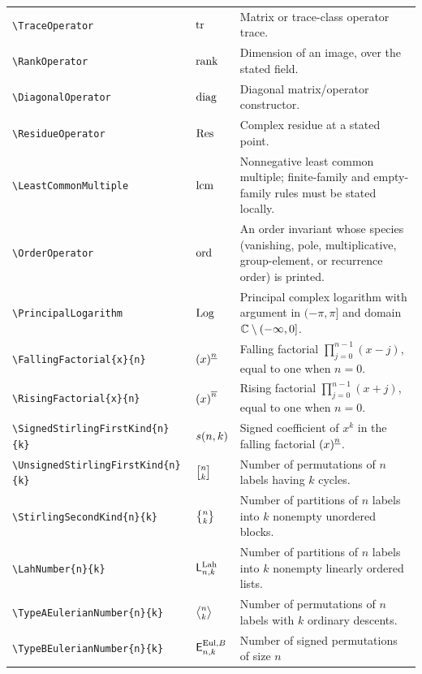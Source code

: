 \documentclass[11pt,oneside]{article}
\theoremstyle{definition}
\theoremstyle{remark}
\DeclareRobustCommand{\commandname}[1]{\texttt{\textbackslash#1}}
\begin{document}
\begin{longtable}{@{}S{0.35\textwidth}L{0.14\textwidth}L{0.45\textwidth}@{}}
\commandname{TraceOperator} & $\operatorname{tr}$ & Matrix or trace-class operator trace.\\
\commandname{RankOperator} & $\operatorname{rank}$ & Dimension of an image, over the stated
field.\\
\commandname{DiagonalOperator} & $\operatorname{diag}$ & Diagonal matrix/operator constructor.\\
\commandname{ResidueOperator} & $\operatorname*{Res}$ & Complex residue at a stated point.\\
\commandname{LeastCommonMultiple} & $\operatorname{lcm}$ & Nonnegative least common
multiple; finite-family and empty-family rules must be stated locally.\\
\commandname{OrderOperator} & $\operatorname{ord}$ & An order invariant whose species
(vanishing, pole, multiplicative, group-element, or recurrence order) is printed.\\
\commandname{PrincipalLogarithm} & $\operatorname{Log}$ & Principal complex logarithm
with argument in $(-\pi,\pi]$ and domain $\mathbb{C}\setminus(-\infty,0]$.\\
\commandname{FallingFactorial}\texttt{\{x\}\{n\}} & $\left(x\right)^{\underline{n}}$ &
Falling factorial $\prod_{j=0}^{n-1}(x-j)$, equal to one when $n=0$.\\
\commandname{RisingFactorial}\texttt{\{x\}\{n\}} & $\left(x\right)^{\overline{n}}$ &
Rising factorial $\prod_{j=0}^{n-1}(x+j)$, equal to one when $n=0$.\\
\commandname{SignedStirlingFirstKind}\texttt{\{n\}\{k\}} &
\(s\!\left(n,k\right)\) & Signed coefficient of \(x^k\) in the
falling factorial \(\left(x\right)^{\underline{n}}\).\\
\commandname{UnsignedStirlingFirstKind}\texttt{\{n\}\{k\}} &
\(\UnsignedStirlingFirstKind{n}{k}\) & Number of permutations of \(n\)
labels having \(k\) cycles.\\
\commandname{StirlingSecondKind}\texttt{\{n\}\{k\}} &
\(\StirlingSecondKind{n}{k}\) & Number of partitions of \(n\) labels into
\(k\) nonempty unordered blocks.\\
\commandname{LahNumber}\texttt{\{n\}\{k\}} & \(\mathsf{L}^{\mathrm{Lah}}_{n,k}\) &
Number of partitions of \(n\) labels into \(k\) nonempty linearly ordered
lists.\\
\commandname{TypeAEulerianNumber}\texttt{\{n\}\{k\}} &
\(\TypeAEulerianNumber{n}{k}\) & Number of permutations of \(n\) labels with
\(k\) ordinary descents.\\
\commandname{TypeBEulerianNumber}\texttt{\{n\}\{k\}} &
\(\mathsf{E}^{\mathrm{Eul},B}_{n,k}\) & Number of signed permutations of size \(n\)

\end{longtable}
\end{document}
